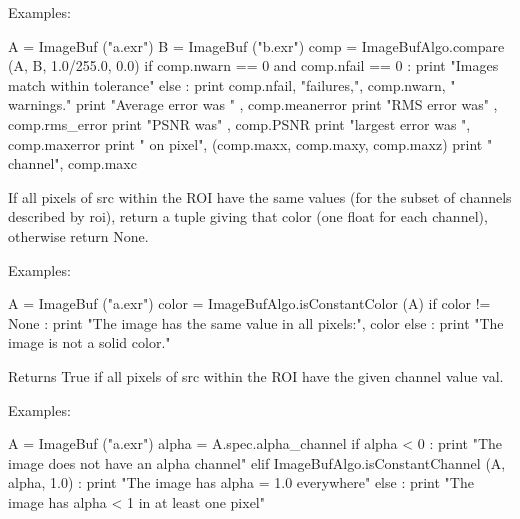 \smallskip
\noindent Examples:
\begin{code}
    A = ImageBuf ("a.exr")
    B = ImageBuf ("b.exr")
    comp = ImageBufAlgo.compare (A, B, 1.0/255.0, 0.0)
    if comp.nwarn == 0 and comp.nfail == 0 :
        print "Images match within tolerance"
    else :
        print comp.nfail, "failures,", comp.nwarn, " warnings."
        print "Average error was " , comp.meanerror
        print "RMS error was" , comp.rms_error
        print "PSNR was" , comp.PSNR
        print "largest error was ", comp.maxerror
        print "  on pixel", (comp.maxx, comp.maxy, comp.maxz)
        print "  channel", comp.maxc
\end{code}
\apiend


 

If all pixels of {\cf src} within the ROI have the same values (for the
subset of channels described by {\cf roi}), return a tuple giving that
color (one {\cf float} for each channel), otherwise return {\cf None}.

\smallskip
\noindent Examples:
\begin{code}
    A = ImageBuf ("a.exr")
    color = ImageBufAlgo.isConstantColor (A)
    if color != None :
        print "The image has the same value in all pixels:", color
    else :
        print "The image is not a solid color."
\end{code}
\apiend


 

Returns {\cf True} if all pixels of {\cf src} within the ROI have the
given {\cf channel} value {\cf val}.

\smallskip
\noindent Examples:
\begin{code}
    A = ImageBuf ("a.exr")
    alpha = A.spec.alpha_channel
    if alpha < 0 :
        print "The image does not have an alpha channel"
    elif ImageBufAlgo.isConstantChannel (A, alpha, 1.0) :
        print "The image has alpha = 1.0 everywhere"
    else :
        print "The image has alpha < 1 in at least one pixel"
\end{code}
\apiend


 

